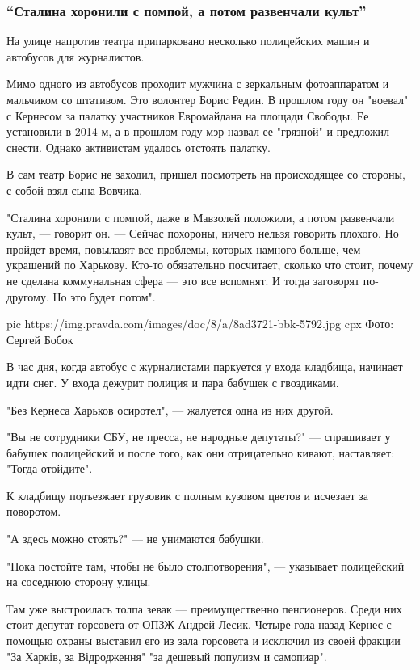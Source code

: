 \subsubsection{\enquote{Сталина хоронили с помпой, а потом развенчали культ}}

На улице напротив театра  припарковано несколько полицейских машин и автобусов
для журналистов. 

Мимо одного из автобусов проходит мужчина с зеркальным фотоаппаратом и
мальчиком со штативом. Это волонтер Борис Редин. В прошлом году он "воевал" с
Кернесом за палатку участников Евромайдана на площади Свободы. Ее установили в
2014-м, а в прошлом году мэр назвал ее "грязной" и предложил снести. Однако
активистам удалось отстоять палатку.

В сам театр Борис не заходил, пришел посмотреть на происходящее со стороны, с
собой взял сына Вовчика.

"Сталина хоронили с помпой, даже в Мавзолей положили, а потом развенчали культ,
— говорит он. — Сейчас похороны, ничего нельзя говорить плохого. Но пройдет
время, повылазят все проблемы, которых намного больше, чем украшений по
Харькову. Кто-то обязательно посчитает, сколько что стоит, почему не сделана
коммунальная сфера — это все вспомнят. И тогда заговорят по-другому. Но это
будет потом". 

\ifcmt
pic https://img.pravda.com/images/doc/8/a/8ad3721-bbk-5792.jpg
cpx Фото: Сергей Бобок
\fi

В час дня, когда автобус с журналистами паркуется у входа кладбища, начинает
идти снег. У входа дежурит полиция и пара бабушек с гвоздиками. 

"Без Кернеса Харьков осиротел", — жалуется одна из них другой.

"Вы не сотрудники СБУ, не пресса, не народные депутаты?" — спрашивает у бабушек
полицейский и после того, как они отрицательно кивают, наставляет: "Тогда
отойдите".

К кладбищу подъезжает грузовик с полным кузовом цветов и исчезает за поворотом.

"А здесь можно стоять?" — не унимаются бабушки.

"Пока постойте там, чтобы не было столпотворения", — указывает полицейский на
соседнюю сторону улицы.

Там уже выстроилась толпа зевак — преимущественно пенсионеров. Среди них стоит
депутат горсовета от ОПЗЖ Андрей Лесик. Четыре года назад Кернес с помощью
охраны выставил его из зала горсовета и исключил из своей фракции "За Харків,
за Відродження" "за дешевый популизм и самопиар".


